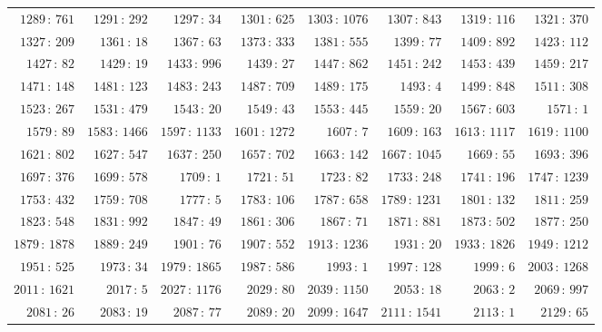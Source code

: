 \documentclass[11pt]{article}
\theoremstyle{plain}
\theoremstyle{definition}
\theoremstyle{remark}
\begin{document}
\begin{center}
\begin{tabular}{rrrrrrrr}
$1289\,{:}\,761$ & $1291\,{:}\,292$ & $1297\,{:}\,34$ & $1301\,{:}\,625$ & $1303\,{:}\,1076$ & $1307\,{:}\,843$ & $1319\,{:}\,116$ & $1321\,{:}\,370$ \\
$1327\,{:}\,209$ & $1361\,{:}\,18$ & $1367\,{:}\,63$ & $1373\,{:}\,333$ & $1381\,{:}\,555$ & $1399\,{:}\,77$ & $1409\,{:}\,892$ & $1423\,{:}\,112$ \\
$1427\,{:}\,82$ & $1429\,{:}\,19$ & $1433\,{:}\,996$ & $1439\,{:}\,27$ & $1447\,{:}\,862$ & $1451\,{:}\,242$ & $1453\,{:}\,439$ & $1459\,{:}\,217$ \\
$1471\,{:}\,148$ & $1481\,{:}\,123$ & $1483\,{:}\,243$ & $1487\,{:}\,709$ & $1489\,{:}\,175$ & $1493\,{:}\,4$ & $1499\,{:}\,848$ & $1511\,{:}\,308$ \\
$1523\,{:}\,267$ & $1531\,{:}\,479$ & $1543\,{:}\,20$ & $1549\,{:}\,43$ & $1553\,{:}\,445$ & $1559\,{:}\,20$ & $1567\,{:}\,603$ & $1571\,{:}\,1$ \\
$1579\,{:}\,89$ & $1583\,{:}\,1466$ & $1597\,{:}\,1133$ & $1601\,{:}\,1272$ & $1607\,{:}\,7$ & $1609\,{:}\,163$ & $1613\,{:}\,1117$ & $1619\,{:}\,1100$ \\
$1621\,{:}\,802$ & $1627\,{:}\,547$ & $1637\,{:}\,250$ & $1657\,{:}\,702$ & $1663\,{:}\,142$ & $1667\,{:}\,1045$ & $1669\,{:}\,55$ & $1693\,{:}\,396$ \\
$1697\,{:}\,376$ & $1699\,{:}\,578$ & $1709\,{:}\,1$ & $1721\,{:}\,51$ & $1723\,{:}\,82$ & $1733\,{:}\,248$ & $1741\,{:}\,196$ & $1747\,{:}\,1239$ \\
$1753\,{:}\,432$ & $1759\,{:}\,708$ & $1777\,{:}\,5$ & $1783\,{:}\,106$ & $1787\,{:}\,658$ & $1789\,{:}\,1231$ & $1801\,{:}\,132$ & $1811\,{:}\,259$ \\
$1823\,{:}\,548$ & $1831\,{:}\,992$ & $1847\,{:}\,49$ & $1861\,{:}\,306$ & $1867\,{:}\,71$ & $1871\,{:}\,881$ & $1873\,{:}\,502$ & $1877\,{:}\,250$ \\
$1879\,{:}\,1878$ & $1889\,{:}\,249$ & $1901\,{:}\,76$ & $1907\,{:}\,552$ & $1913\,{:}\,1236$ & $1931\,{:}\,20$ & $1933\,{:}\,1826$ & $1949\,{:}\,1212$ \\
$1951\,{:}\,525$ & $1973\,{:}\,34$ & $1979\,{:}\,1865$ & $1987\,{:}\,586$ & $1993\,{:}\,1$ & $1997\,{:}\,128$ & $1999\,{:}\,6$ & $2003\,{:}\,1268$ \\
$2011\,{:}\,1621$ & $2017\,{:}\,5$ & $2027\,{:}\,1176$ & $2029\,{:}\,80$ & $2039\,{:}\,1150$ & $2053\,{:}\,18$ & $2063\,{:}\,2$ & $2069\,{:}\,997$ \\
$2081\,{:}\,26$ & $2083\,{:}\,19$ & $2087\,{:}\,77$ & $2089\,{:}\,20$ & $2099\,{:}\,1647$ & $2111\,{:}\,1541$ & $2113\,{:}\,1$ & $2129\,{:}\,65$ \\

\end{tabular}
\end{center}
\end{document}
